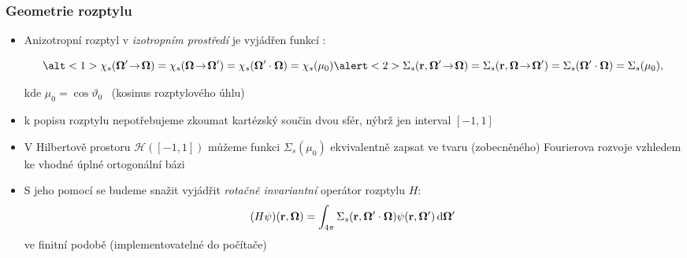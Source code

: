 \begin{frame}[t]
  \frametitle{Geometrie rozptylu}
  \vspace{.2em}
  \begin{itemize}
  	\item Anizotropní rozptyl v \textcolor{structure}{\emph{izotropním prostředí}} je vyjádřen funkcí :
  	\begin{overlayarea}{\textwidth}{2.35em}
  	\shorten{-.5em}{-.5em}
  	$$
  	  \alt<1>{
  	    \chi_s(\bomega'\ra\bomega) = \chi_s(\bomega\ra\bomega') = \chi_s(\bomega'\cdot\bomega) = \chi_s(\mu_0)
  	  }{
  	    \alert<2>{\Sigma_s(\br,\bomega'\ra\bomega)} = \Sigma_s(\br,\bomega\ra\bomega') = \Sigma_s(\bomega'\cdot\bomega) = \Sigma_s(\mu_0)
  	  },
  	$$
  	\lengthen
  	\end{overlayarea}
  	kde $\mu_0 = \cos \vartheta_0$ ~(kosinus rozptylového úhlu)\\[.5em]
  	
  	\item<3->[$\Rabullet$] k popisu rozptylu nepotřebujeme zkoumat kartézský součin dvou sfér, nýbrž jen interval $[-1,1]$\\[1em]
  	\item<4-> V Hilbertově prostoru $\mathcal{H}([-1,1])$ můžeme funkci $\Sigma_s(\mu_0)$ ekvivalentně zapsat ve tvaru (zobecněného) Fourierova rozvoje vzhledem ke vhodné \alert<6>{úplné ortogonální bázi}
  	\item<5-> S jeho pomocí se budeme snažit vyjádřit \emph{\textcolor{structure}{rotačně invariantní}} operátor rozptylu $H$:
  	$$
  	  (H\psi)(\mathbf{r},\mathbf{\Omega}) = \int_{4\pi}{
        \Sigma_s(\mathbf{r}, \mathbf{\Omega}'\cdot\mathbf{\Omega})
        \psi(\mathbf{r},\mathbf{\Omega}')
      }\,\mathrm{d}\mathbf{\Omega}'\,
  	$$
  	ve finitní podobě (implementovatelné do počítače)
  \end{itemize}

\end{frame}

